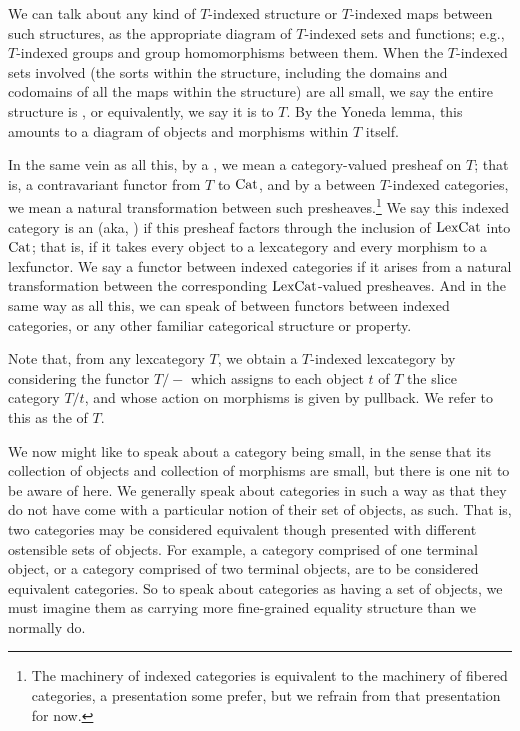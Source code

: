 We can talk about any kind of $T$-indexed structure or $T$-indexed maps between such structures, as the appropriate diagram of $T$-indexed sets and functions; e.g., $T$-indexed groups and group homomorphisms between them. When the $T$-indexed sets involved (the sorts within the structure, including the domains and codomains of all the maps within the structure) are all small, we say the entire structure is , or equivalently, we say it is  to $T$. By the Yoneda lemma, this amounts to a diagram of objects and morphisms within $T$ itself.

In the same vein as all this, by a , we mean a category-valued presheaf on $T$; that is, a contravariant functor from $T$ to $\mathrm{Cat}$, and by a  between $T$-indexed categories, we mean a natural transformation between such presheaves.\footnote{The machinery of indexed categories is equivalent to the machinery of fibered categories, a presentation some prefer, but we refrain from that presentation for now.} We say this indexed category is an  (aka, ) if this presheaf factors through the inclusion of $\mathrm{LexCat}$ into $\mathrm{Cat}$; that is, if it takes every object to a lexcategory and every morphism to a lexfunctor. We say a functor between indexed categories  if it arises from a natural transformation between the corresponding $\mathrm{LexCat}$-valued presheaves. And in the same way as all this, we can speak of  between functors between indexed categories, or any other familiar categorical structure or property.

Note that, from any lexcategory $T$, we obtain a $T$-indexed lexcategory by considering the functor $T/-$ which assigns to each object $t$ of $T$ the slice category $T/t$, and whose action on morphisms is given by pullback. We refer to this as the  of $T$.

We now might like to speak about a category being small, in the sense that its collection of objects and collection of morphisms are small, but there is one nit to be aware of here. We generally speak about categories in such a way as that they do not have come with a particular notion of their set of objects, as such. That is, two categories may be considered equivalent though presented with different ostensible sets of objects. For example, a category comprised of one terminal object, or a category comprised of two terminal objects, are to be considered equivalent categories. So to speak about categories as having a set of objects, we must imagine them as carrying more fine-grained equality structure than we normally do.


